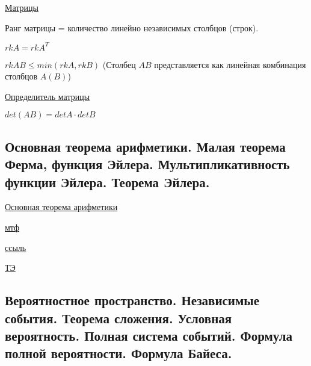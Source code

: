 \documentclass{article}
\begin{document}
\href{https://ru.wikipedia.org/wiki/%D0%9C%D0%B0%D1%82%D1%80%D0%B8%D1%86%D0%B0_(%D0%BC%D0%B0%D1%82%D0%B5%D0%BC%D0%B0%D1%82%D0%B8%D0%BA%D0%B0)}{Матрицы}

Ранг матрицы = количество линейно независимых столбцов (строк).

$rk A = rk A^T$

$rk AB \leq min(rk A, rk B)$ (Столбец $AB$ представляется как линейная
комбинация столбцов $A (B)$)

\href{https://ru.wikipedia.org/wiki/%D0%9E%D0%BF%D1%80%D0%B5%D0%B4%D0%B5%D0%BB%D0%B8%D1%82%D0%B5%D0%BB%D1%8C}{Определитель матрицы}

$det(AB) = det A \cdot det B$


\subsection{Основная теорема арифметики. Малая теорема Ферма, функция
Эйлера. Мультипликативность функции Эйлера. Теорема Эйлера.}

\href{https://ru.wikipedia.org/wiki/%D0%9E%D1%81%D0%BD%D0%BE%D0%B2%D0%BD%D0%B0%D1%8F_%D1%82%D0%B5%D0%BE%D1%80%D0%B5%D0%BC%D0%B0_%D0%B0%D1%80%D0%B8%D1%84%D0%BC%D0%B5%D1%82%D0%B8%D0%BA%D0%B8}{Основная теорема арифметики}


\href{https://ru.wikipedia.org/wiki/%D0%9C%D0%B0%D0%BB%D0%B0%D1%8F_%D1%82%D0%B5%D0%BE%D1%80%D0%B5%D0%BC%D0%B0_%D0%A4%D0%B5%D1%80%D0%BC%D0%B0}{мтф}

\href{https://ru.wikipedia.org/wiki/%D0%A4%D1%83%D0%BD%D0%BA%D1%86%D0%B8%D1%8F_%D0%AD%D0%B9%D0%BB%D0%B5%D1%80%D0%B0}{ссыль}


\href{https://ru.wikipedia.org/wiki/%D0%A2%D0%B5%D0%BE%D1%80%D0%B5%D0%BC%D0%B0_%D0%AD%D0%B9%D0%BB%D0%B5%D1%80%D0%B0_(%D1%82%D0%B5%D0%BE%D1%80%D0%B8%D1%8F_%D1%87%D0%B8%D1%81%D0%B5%D0%BB)}{ТЭ}


\subsection{Вероятностное пространство. Независимые события. Теорема
сложения. Условная вероятность. Полная система событий. Формула
полной вероятности. Формула Байеса.}
\end{document}
